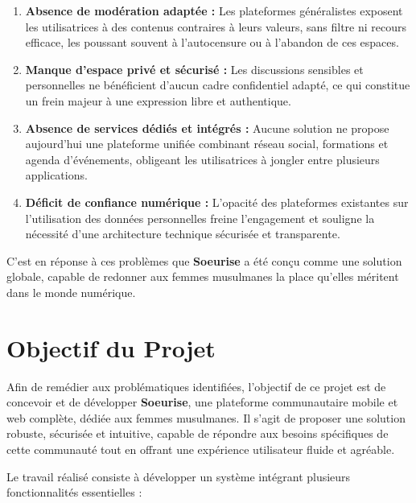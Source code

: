 \documentclass[12pt,a4paper]{report}
\begin{document}
	\begin{enumerate}[label=\textbf{\arabic*.},leftmargin=1.5cm]
		
		\item \textbf{Absence de modération adaptée :} Les plateformes généralistes exposent 
		les utilisatrices à des contenus contraires à leurs valeurs, sans filtre ni recours 
		efficace, les poussant souvent à l'autocensure ou à l'abandon de ces espaces.
		
		\item \textbf{Manque d'espace privé et sécurisé :} Les discussions sensibles et 
		personnelles ne bénéficient d'aucun cadre confidentiel adapté, ce qui constitue 
		un frein majeur à une expression libre et authentique.
		
		\item \textbf{Absence de services dédiés et intégrés :} Aucune solution ne propose 
		aujourd'hui une plateforme unifiée combinant réseau social, formations et agenda 
		d'événements, obligeant les utilisatrices à jongler entre plusieurs applications.
		
		\item \textbf{Déficit de confiance numérique :} L'opacité des plateformes existantes 
		sur l'utilisation des données personnelles freine l'engagement et souligne la 
		nécessité d'une architecture technique sécurisée et transparente.
		
	\end{enumerate}
	
	\medskip
	
	C'est en réponse à ces problèmes que \textbf{Soeurise} a été conçu comme une solution 
	globale, capable de redonner aux femmes musulmanes la place qu'elles méritent dans 
	le monde numérique.
	
	\section{Objectif du Projet}
	
	Afin de remédier aux problématiques identifiées, l'objectif de ce projet est de 
	concevoir et de développer \textbf{Soeurise}, une plateforme communautaire mobile 
	et web complète, dédiée aux femmes musulmanes. Il s'agit de proposer une solution 
	robuste, sécurisée et intuitive, capable de répondre aux besoins spécifiques de 
	cette communauté tout en offrant une expérience utilisateur fluide et agréable.
	
	Le travail réalisé consiste à développer un système intégrant plusieurs fonctionnalités 
	essentielles :
	
\end{document}
